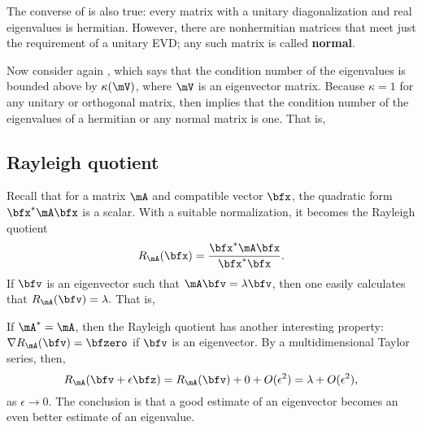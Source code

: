 The converse of  is also true: every matrix with a unitary diagonalization and real eigenvalues is hermitian. However, there are nonhermitian matrices that meet just the requirement of a unitary EVD; any such matrix is called \textbf{normal}.

\begin{exam}
\end{exam}

Now consider again , which says that the condition number of the eigenvalues is bounded above by $\kappa(\mV)$, where $\mV$ is an eigenvector matrix. Because $\kappa=1$ for any unitary or orthogonal matrix,  then implies that the condition number of the eigenvalues of a hermitian or any normal matrix is one. That is, 

\begin{exam*}
\end{exam*}

\subsection{Rayleigh quotient}

Recall that for a matrix $\mA$ and compatible vector $\bfx$, the quadratic form $\bfx^* \mA \bfx$ is a scalar. With a suitable normalization, it becomes the \gls{Rayleigh quotient}
\begin{equation}
  \label{eq:rayleigh}
  R_{\mA}(\bfx) = \frac{ \bfx^* \mA \bfx}{\bfx^* \bfx}.
\end{equation}
If $\bfv$ is an eigenvector such that $\mA \bfv=\lambda \bfv$, then one easily calculates that $R_{\mA}(\bfv)=\lambda.$ That is, 

If $\mA^*=\mA$, then the Rayleigh quotient has another interesting property: $\nabla R_{\mA}(\bfv)=\bfzero$ if $\bfv$ is an eigenvector. By a multidimensional Taylor series, then,
\begin{equation}
  \label{eq:rq-series}
  R_{\mA}(\bfv+\epsilon\bfz) = R_{\mA}(\bfv) + 0 + O( \epsilon^2) =  \lambda + O( \epsilon^2),
\end{equation}
as $\epsilon\to 0$. The conclusion is that a good estimate of an eigenvector becomes an even better estimate of an eigenvalue.


